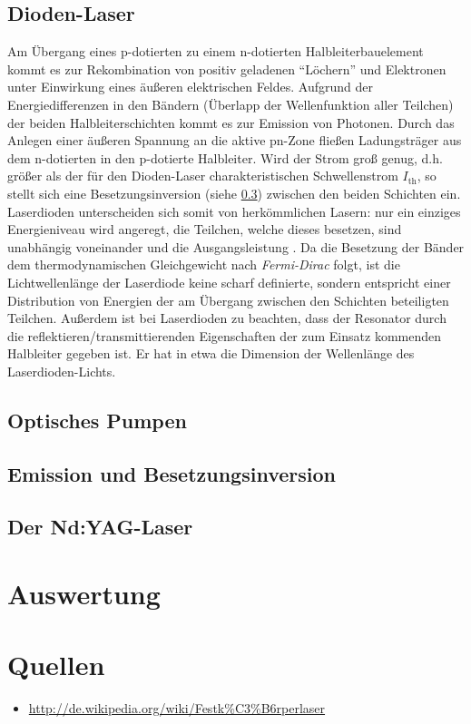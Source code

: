 \documentclass[numbers=noenddot,12pt,a4paper]{scrartcl}
\newcommand{\ix}[1]{_\text{#1}}
\newcommand{\tilt}[1]{\mbox{\textit{#1}}}
\begin{document}
\subsection{Dioden-Laser}\label{subsec:dlaser}
Am Übergang eines p-dotierten zu einem n-dotierten Halbleiterbauelement kommt es zur Rekombination von positiv geladenen "`Löchern"' und Elektronen unter Einwirkung eines äußeren elektrischen Feldes. Aufgrund der Energiedifferenzen in den Bändern (Überlapp der Wellenfunktion aller Teilchen) der beiden Halbleiterschichten kommt es zur Emission von Photonen. Durch das Anlegen einer äußeren Spannung an die aktive pn-Zone fließen Ladungsträger aus dem n-dotierten in den p-dotierte Halbleiter. Wird der Strom groß genug, d.h. größer als der für den Dioden-Laser charakteristischen Schwellenstrom $I\ix{th}$, so stellt sich eine Besetzungsinversion (siehe \ref{subsec:besetzinv}) zwischen den beiden Schichten ein.
\\Laserdioden unterscheiden sich somit von herkömmlichen Lasern: nur ein einziges Energieniveau wird angeregt, die Teilchen, welche dieses besetzen, sind unabhängig voneinander und die Ausgangsleistung . Da die Besetzung der Bänder dem thermodynamischen Gleichgewicht nach \tilt{Fermi-Dirac} folgt, ist die Lichtwellenlänge der Laserdiode keine scharf definierte, sondern entspricht einer Distribution von Energien der am Übergang zwischen den Schichten beteiligten Teilchen. Außerdem ist bei Laserdioden zu beachten, dass der Resonator durch die reflektieren/transmittierenden Eigenschaften der zum Einsatz kommenden Halbleiter gegeben ist. Er hat in etwa die Dimension der Wellenlänge des Laserdioden-Lichts.\\ 
\subsection{Optisches Pumpen}\label{subsec:optpump}
\subsection{Emission und Besetzungsinversion}\label{subsec:besetzinv}
\subsection{Der Nd:YAG-Laser}\label{subsec:nd-yag}
\section{Auswertung}

\section{Quellen}
\begin{itemize}
	\item{\url{http://de.wikipedia.org/wiki/Festk%C3%B6rperlaser}}	
\end{itemize}
\end{document}
